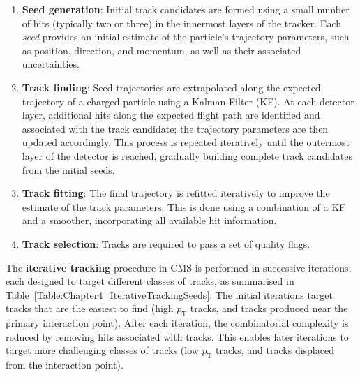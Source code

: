 \begin{enumerate}
    \item \textbf{Seed generation}: Initial track candidates are formed using a small number of hits (typically two or three) in the innermost layers of the tracker. Each \textit{seed} provides an initial estimate of the particle's trajectory parameters, such as position, direction, and momentum, as well as their associated uncertainties. 
    \item \textbf{Track finding}: Seed trajectories are extrapolated along the expected trajectory of a charged particle using a Kalman Filter (KF). At each detector layer, additional hits along the expected flight path are identified and associated with the track candidate; the trajectory parameters are then updated accordingly. This process is repeated iteratively until the outermost layer of the detector is reached, gradually building complete track candidates from the initial seeds.
    \item \textbf{Track fitting}: The final trajectory is refitted iteratively to improve the estimate of the track parameters. This is done using a combination of a KF and a smoother, incorporating all available hit information.
    \item \textbf{Track selection}: Tracks are required to pass a set of quality flags.
\end{enumerate}

The \textbf{iterative tracking} procedure in \ac{CMS} is performed in successive iterations, each designed to target different classes of tracks, as summarised in Table~\ref{Table:Chapter4_IterativeTrackingSeeds}. The initial iterations target tracks that are the easiest to find (\eg high $p_\mathrm{T}$ tracks, and tracks produced near the primary interaction point). After each iteration, the combinatorial complexity is reduced by removing hits associated with tracks. This enables later iterations to target more challenging classes of tracks (\eg low $p_\mathrm{T}$ tracks, and tracks displaced from the interaction point). 

